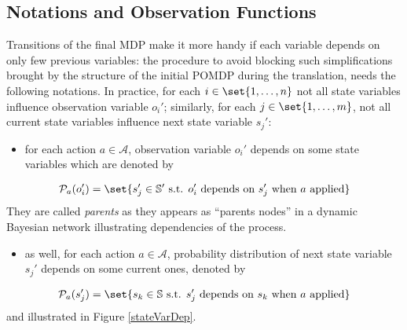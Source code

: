 \subsection{Notations and Observation Functions}
Transitions of the final MDP make it more handy if each variable depends
on only few previous variables: the procedure to avoid blocking such simplifications brought by the
structure of the initial POMDP during the translation, needs the following notations.
In practice, for each $i \in \set{1, \ldots, n}$ not all state variables influence 
observation variable $o_i'$; similarly, for each $j \in \set{1, \ldots, m}$, 
not all current state variables influence next state variable $s_j'$:
\begin{itemize}
\item for each action $a \in \mathcal{A}$, observation variable $o_i'$ 
depends on some state variables which are denoted by
\end{itemize}
\begin{eqnarray*} 
\mathcal{P}_a(o_i') = \set{ s_j' \in \mathbb{S}' \mbox{ s.t. } o_i' \mbox{ depends on } 
s_j' \mbox{ when } a \mbox{ applied} } 
\end{eqnarray*}
They are called \textit{parents} as they appears as ``parents nodes'' in a dynamic Bayesian network \cite{Dean:1989:DBN} 
illustrating dependencies of the process.
\begin{itemize}
\item as well, for each action $a \in \mathcal{A}$, probability distribution 
of next state variable $s_j'$ 
depends on some current ones, denoted by
\end{itemize}
\begin{eqnarray*}
\mathcal{P}_a(s_j') = \set{ s_k \in \mathbb{S} \mbox{ s.t. } s_j' \mbox{ depends on } s_k \mbox{ when } a \mbox{ applied} }	
\end{eqnarray*}
and illustrated in Figure \ref{stateVarDep}.
